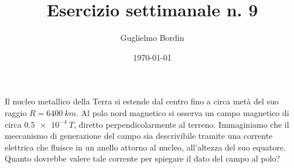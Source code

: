 \documentclass[10pt]{gulartcl}
\title{Esercizio settimanale n. 9}
\author{Guglielmo Bordin}
\date{\today}
\begin{document}
\maketitle 

\noindent
Il nucleo metallico della Terra si estende dal centro fino a circa metà del
suo raggio $R = \qty{6400}{km}$. Al polo nord magnetico si osserva un campo
magnetico di circa $\qty{0.5e-4}{T}$, diretto perpendicolarmente al
terreno. Immaginiamo che il meccanismo di generazione del campo sia
descrivibile tramite una corrente elettrica che fluisce in un anello
attorno al nucleo, all’altezza del suo equatore. Quanto dovrebbe valere
tale corrente per spiegare il dato del campo al polo?
\end{document}
